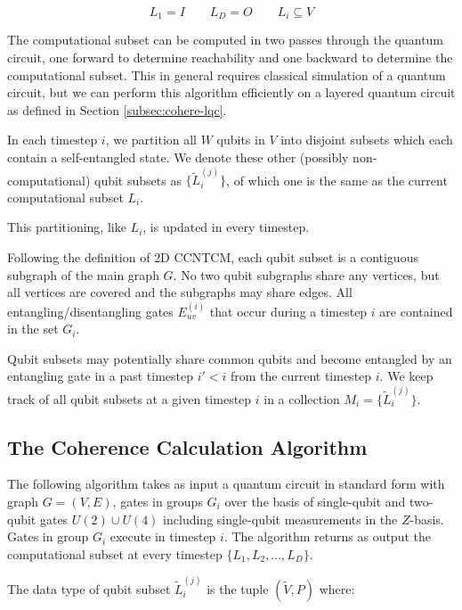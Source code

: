 \begin{equation}
L_1 = I \qquad L_D = O \qquad L_i \subseteq V
\end{equation}

The computational subset can be computed in two passes through
the quantum circuit, one forward to determine reachability and one backward
to determine the computational subset. This in general requires classical simulation of a
quantum circuit, but we can perform this algorithm efficiently on a
layered quantum circuit as defined in Section \ref{subsec:cohere-lqc}.

In each timestep $i$, we partition all $W$ qubits in $V$ into disjoint
subsets which each contain a self-entangled state. We denote these other
(possibly non-computational) qubit subsets as $\{\tilde{L}^{(j)}_i\}$,
of which one is the same as the current
computational subset $L_i$.

This partitioning, like $L_i$, is updated in
every timestep.

Following the definition of \textsf{2D CCNTCM}, each qubit subset is a
contiguous subgraph of the main graph $G$. No two qubit subgraphs share any vertices,
but all vertices are covered and the subgraphs may share edges. All entangling/disentangling gates $E^{(i)}_{uv}$
that occur during a timestep $i$ are contained in the set $G_i$.

Qubit subsets may potentially share common qubits and become entangled by an entangling gate
in a past timestep $i' < i$ from the current timestep $i$.
We keep track of all qubit subsets at a given timestep $i$
in a collection $M_i = \{\tilde{L}^{(j)}_i \}$.

\subsection{The Coherence Calculation Algorithm}
\label{subsec:cohere-algo}

The following algorithm takes as input a quantum circuit in standard form
with graph $G = (V,E)$, gates in groups $G_i$
over the basis of single-qubit and two-qubit gates
$U(2) \cup U(4)$ including single-qubit measurements in the $Z$-basis.
Gates in group $G_i$ execute in timestep $i$.
The algorithm returns as output the computational subset at every timestep $\{ L_1, L_2, \ldots, L_D \}$.

The data type of qubit subset $\tilde{L}^{(j)}_i$ is the tuple
$(\tilde{V}, P)$ where:

